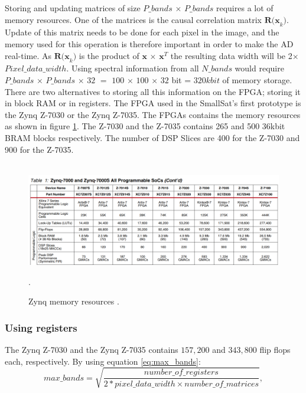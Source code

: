Storing and updating matrices of size $P\_bands$ $\times$ $P\_bands$  requires a lot of memory resources. %
One of the matrices is the causal correlation matrix $\textbf{R(x}_k)$. Update of this matrix needs to be done for each pixel in the image, and the memory used for this operation is therefore important in order to make the AD real-time.  As $\textbf{R(x}_k)$ is the product of $\textbf{x}$ $\times$ $\textbf{x}^T$ the resulting data width will be 2$\times$ $Pixel\_data\_width$. Using spectral information from all $N\_bands$ would require $P\_bands$ $\times$ $P\_bands$ $\times$ $32$ $=$ $100$ $\times$ $100$ $\times$ $32$ bit = $320 kbit$ of memory storage. 
\\

There are two alternatives to storing all this information on the FPGA; storing it in block RAM or in registers. The FPGA used in the SmallSat's first prototype is the Zynq Z-7030 or the Zynq Z-7035. 
The FPGAs contains the memory resources as shown in figure \ref{fig:zynq_memory_resources}. The Z-7030 and the Z-7035 contains 265 and 500 36kbit BRAM blocks respectively. The number of DSP Slices are 400 for the Z-7030 and 900 for the Z-7035. 





\begin{figure}[H]
\hbox{\hspace*{-1cm}                               \includegraphics[scale=0.45]{images/zynq_memory_resources.PNG}}
  \caption{Zynq memory resources \cite{cite:mem_resources_zynq}.} 
  \label{fig:zynq_memory_resources}.
\end{figure}

\subsubsection{Using registers}
The Zynq Z-7030 and the Zynq Z-7035 contains $157,200$ and $343,800$ flip flops each, respectively. By using equation \ref{eq:max_bands}:%
\begin{equation}
    max\_bands= \sqrt{\frac{number\_of\_registers}{2*pixel\_data\_width \times number\_of\_matrices}},
    \label{eq:max_bands}
\end{equation}

